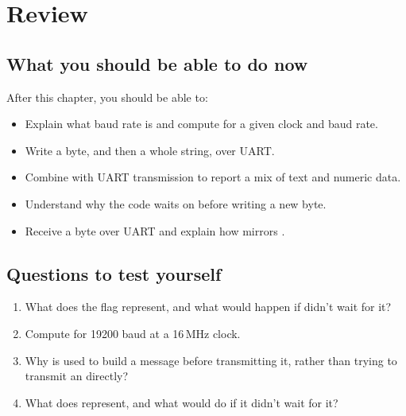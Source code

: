 
\section{Review}
\label{c6:sec:review}

\subsection*{What you should be able to do now}
After this chapter, you should be able to:
\begin{itemize}
  \item Explain what baud rate is and compute  for a given clock and baud rate.
  \item Write a byte, and then a whole string, over UART.
  \item Combine  with UART transmission to report a mix of text and numeric data.
  \item Understand why the code waits on  before writing a new byte.
  \item Receive a byte over UART and explain how  mirrors .
\end{itemize}

\subsection*{Questions to test yourself}
\begin{enumerate}
  \item What does the  flag represent, and what would happen if
     didn't wait for it?
  \item Compute  for 19200 baud at a 16\,MHz clock.
  \item Why is  used to build a message before transmitting it, rather than trying
    to transmit an  directly?
  \item What does  represent, and what would  do if it didn't
    wait for it?
\end{enumerate}

